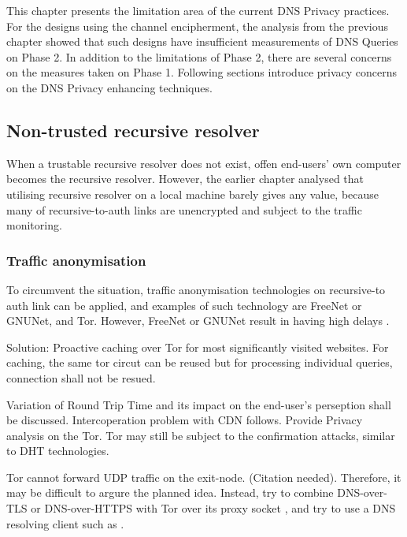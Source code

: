 This chapter presents the limitation area of the current DNS Privacy practices.
For the designs using the channel encipherment, the analysis from the previous chapter showed that such designs have insufficient measurements of DNS Queries on Phase 2.
In addition to the limitations of Phase 2, there are several concerns on the measures taken on Phase 1. Following sections introduce privacy concerns on the DNS Privacy enhancing techniques.




\subsection{Non-trusted recursive resolver}
When a trustable recursive resolver does not exist, offen end-users' own computer becomes the recursive resolver. However, the earlier chapter analysed that utilising recursive resolver on a local machine barely gives any value, because many of recursive-to-auth links are unencrypted and subject to the traffic monitoring.

\subsubsection{Traffic anonymisation}
To circumvent the situation, traffic anonymisation technologies on recursive-to auth link can be applied, and examples of such technology are  FreeNet \cite{clarke2001freenet} or GNUNet\cite{grothoff2017gnunet}, and Tor.
However, FreeNet \cite{clarke2001freenet} or GNUNet \cite{grothoff2017gnunet} result in having high delays \cite{anonymousoverdns}.

Solution: Proactive caching \cite{cohen2003proactive} over Tor for most significantly visited websites. For caching, the same tor circut can be reused but for processing individual queries, connection shall not be resued.

Variation of Round Trip Time and its impact on the end-user's perseption shall be discussed. Intercoperation problem with CDN follows.
Provide Privacy analysis on the Tor. Tor may still be subject to the confirmation attacks, similar to DHT technologies. 

Tor cannot forward UDP traffic on the exit-node. (Citation needed). Therefore, it may be difficult to argure the planned idea.
Instead, try to combine DNS-over-TLS or DNS-over-HTTPS with Tor over its proxy socket \cite{tor-socks}, and try to use a DNS resolving client such as \cite{technitium-configuration}. 